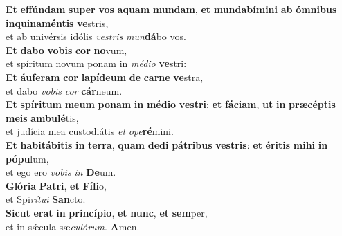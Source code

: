 \evenverse \textbf{Et} \textbf{ef}\textbf{fún}\textbf{dam} \textbf{su}\textbf{per} \textbf{vos} \textbf{a}\textbf{quam} \textbf{mun}\textbf{dam}, \textbf{et} \textbf{mun}\textbf{da}\textbf{bí}\textbf{mi}\textbf{ni} \textbf{ab} \textbf{óm}\textbf{ni}\textbf{bus} \textbf{in}\textbf{qui}\textbf{na}\textbf{mén}\textbf{tis} \textbf{ve}stris,~\*\\
\evenverse et ab univérsis idólis \textit{ve}\textit{stris} \textit{mun}\textbf{dá}bo vos.\\
\oddverse \textbf{Et} \textbf{da}\textbf{bo} \textbf{vo}\textbf{bis} \textbf{cor} \textbf{no}vum,~\*\\
\oddverse et spíritum novum ponam in \textit{mé}\textit{di}\textit{o} \textbf{ve}stri:\\
\evenverse \textbf{Et} \textbf{áu}\textbf{fe}\textbf{ram} \textbf{cor} \textbf{la}\textbf{pí}\textbf{de}\textbf{um} \textbf{de} \textbf{car}\textbf{ne} \textbf{ve}stra,~\*\\
\evenverse et dabo \textit{vo}\textit{bis} \textit{cor} \textbf{cár}neum.\\
\oddverse \textbf{Et} \textbf{spí}\textbf{ri}\textbf{tum} \textbf{me}\textbf{um} \textbf{po}\textbf{nam} \textbf{in} \textbf{mé}\textbf{di}\textbf{o} \textbf{ve}\textbf{stri}: \textbf{et} \textbf{fá}\textbf{ci}\textbf{am}, \textbf{ut} \textbf{in} \textbf{præ}\textbf{cép}\textbf{tis} \textbf{me}\textbf{is} \textbf{am}\textbf{bu}\textbf{lé}tis,~\*\\
\oddverse et judícia mea custodiátis \textit{et} \textit{o}\textit{pe}\textbf{ré}mini.\\
\evenverse \textbf{Et} \textbf{ha}\textbf{bi}\textbf{tá}\textbf{bi}\textbf{tis} \textbf{in} \textbf{ter}\textbf{ra}, \textbf{quam} \textbf{de}\textbf{di} \textbf{pá}\textbf{tri}\textbf{bus} \textbf{ve}\textbf{stris}: \textbf{et} \textbf{é}\textbf{ri}\textbf{tis} \textbf{mi}\textbf{hi} \textbf{in} \textbf{pó}\textbf{pu}lum,~\*\\
\evenverse et ego ero \textit{vo}\textit{bis} \textit{in} \textbf{De}um.\\
\oddverse \textbf{Gló}\textbf{ri}\textbf{a} \textbf{Pa}\textbf{tri}, \textbf{et} \textbf{Fí}\textbf{li}o,~\*\\
\oddverse et Spi\textit{rí}\textit{tu}\textit{i} \textbf{San}cto.\\
\evenverse \textbf{Si}\textbf{cut} \textbf{e}\textbf{rat} \textbf{in} \textbf{prin}\textbf{cí}\textbf{pi}\textbf{o}, \textbf{et} \textbf{nunc}, \textbf{et} \textbf{sem}per,~\*\\
\evenverse et in sǽcula sæ\textit{cu}\textit{ló}\textit{rum}. \textbf{A}men.\\
